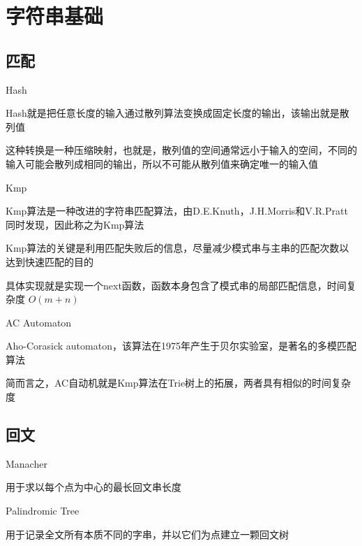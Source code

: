 \documentclass[UTF8]{beamer}
\begin{document}
	\section{字符串基础}

		\subsection{匹配}

			\begin{frame}{Hash}

			Hash就是把任意长度的输入通过散列算法变换成固定长度的输出，该输出就是散列值

			这种转换是一种压缩映射，也就是，散列值的空间通常远小于输入的空间，不同的输入可能会散列成相同的输出，所以不可能从散列值来确定唯一的输入值

			\end{frame}

			\begin{frame}{Kmp}

			Kmp算法是一种改进的字符串匹配算法，由D.E.Knuth，J.H.Morris和V.R.Pratt同时发现，因此称之为Kmp算法

			Kmp算法的关键是利用匹配失败后的信息，尽量减少模式串与主串的匹配次数以达到快速匹配的目的

			具体实现就是实现一个next函数，函数本身包含了模式串的局部匹配信息，时间复杂度 $O(m+n)$

			\end{frame}

			\begin{frame}{AC Automaton}

			Aho-Corasick automaton，该算法在1975年产生于贝尔实验室，是著名的多模匹配算法

			简而言之，AC自动机就是Kmp算法在Trie树上的拓展，两者具有相似的时间复杂度

			\end{frame}

		\subsection{回文}

			\begin{frame}{Manacher}

			用于求以每个点为中心的最长回文串长度

			\end{frame}

			\begin{frame}{Palindromic Tree}

			用于记录全文所有本质不同的字串，并以它们为点建立一颗回文树

			\end{frame}
\end{document}

